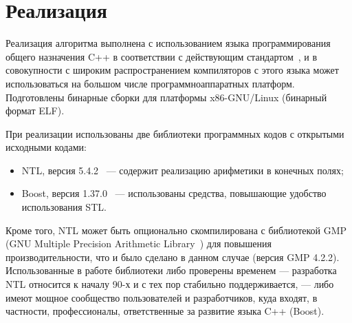 \documentclass[14pt]{extarticle}
\begin{document}
\begin{enumerate}
%
%		
%		
%		
		
\end{enumerate}


\section{Реализация}

Реализация алгоритма выполнена с использованием языка программирования общего
назначения C++ в соответствии с действующим стандартом~\cite{CppStand}, и в
совокупности с широким распространением компиляторов с этого языка может
использоваться на большом числе программно\nbdash аппаратных платформ. Подготовлены
бинарные сборки для платформы x86-GNU/Linux (бинарный формат ELF).

При реализации использованы две библиотеки программных кодов с открытыми
исходными кодами:
\renewcommand{\labelitemi}{\textbullet}
\begin{itemize}
    \item NTL, версия 5.4.2~\cite{NTL} —
    содержит реализацию арифметики в конечных полях;
    \item Boost, версия 1.37.0~\cite{Boost} — использованы средства, повышающие
    удобство использования STL.
\end{itemize}
Кроме того, NTL может быть опционально скомпилирована с библиотекой GMP (GNU
Multiple Precision Arithmetic Library~\cite{GMP}) для повышения
производительности, что и было сделано в данном случае (версия GMP 4.2.2).
Использованные в работе библиотеки либо проверены временем — разработка NTL
относится к началу 90-х и с тех пор стабильно поддерживается, — либо имеют
мощное сообщество пользователей и разработчиков, куда входят, в частности,
профессионалы, ответственные за развитие языка C++ (Boost).
\end{document}
